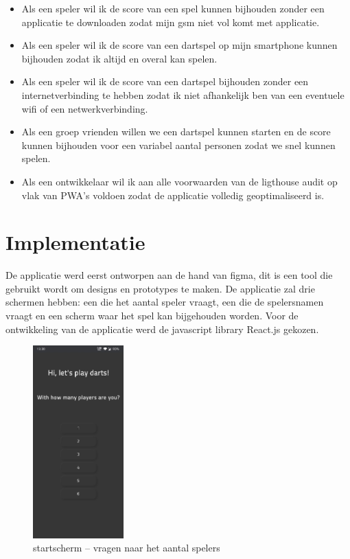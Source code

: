 	\begin{itemize}
		 \item 	Als een speler wil ik de score van een spel kunnen bijhouden zonder een applicatie te downloaden zodat mijn gsm niet vol komt met applicatie.
		 \item 	Als een speler wil ik de score van een dartspel op mijn smartphone kunnen bijhouden zodat ik altijd en overal kan spelen.
		 \item 	Als een speler wil ik de score van een dartspel bijhouden zonder een internetverbinding te hebben zodat ik niet afhankelijk ben van een eventuele wifi of een netwerkverbinding.
		 \item 	Als een groep vrienden willen we een dartspel kunnen starten en de score kunnen bijhouden voor een variabel aantal personen zodat we snel kunnen spelen.
		 \item Als een ontwikkelaar wil ik aan alle voorwaarden van de ligthouse audit op vlak van PWA's voldoen zodat de applicatie volledig geoptimaliseerd is.
	\end{itemize}	
	
	


\section{Implementatie}

	De applicatie werd eerst ontworpen aan de hand van figma, dit is een tool die gebruikt wordt om designs en prototypes te maken. De applicatie zal drie schermen hebben: een die het aantal speler vraagt, een die de spelersnamen vraagt en een scherm waar het spel kan bijgehouden worden. 
	Voor de ontwikkeling van de applicatie werd de javascript library React.js gekozen.
	
	
	\begin{figure}[H]
		\centering
		\includegraphics[width=35mm]{./img/dart1.png}{}
		\caption{startscherm – vragen naar het aantal spelers}
	\end{figure}
	
